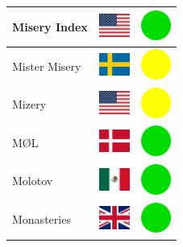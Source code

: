 \documentclass[12pt, a4paper, twoside]{report}
\begin{document}
\begin{center}
\begin{longtable}{|p{5cm}|p{2cm}|p{2cm}|}
Misery Index & \includegraphics[width=1cm]{4x3/us} & \includegraphics[width=1cm]{likes/y} \\ \hline
Mister Misery & \includegraphics[width=1cm]{4x3/se} & \includegraphics[width=1cm]{likes/m} \\ \hline
Mizery & \includegraphics[width=1cm]{4x3/us} & \includegraphics[width=1cm]{likes/m} \\ \hline
MØL & \includegraphics[width=1cm]{4x3/dk} & \includegraphics[width=1cm]{likes/y} \\ \hline
Molotov & \includegraphics[width=1cm]{4x3/mx} & \includegraphics[width=1cm]{likes/y} \\ \hline
Monasteries & \includegraphics[width=1cm]{4x3/gb} & \includegraphics[width=1cm]{likes/y} \\ \hline

\end{longtable}
\end{center}
\end{document}
